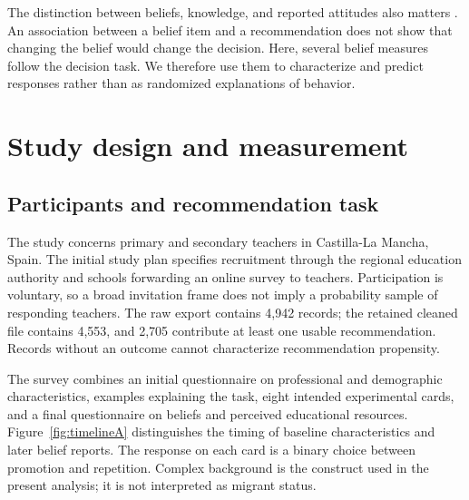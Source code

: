 The distinction between beliefs, knowledge, and reported attitudes also matters \cite{pajares}. An association between a belief item and a recommendation does not show that changing the belief would change the decision. Here, several belief measures follow the decision task. We therefore use them to characterize and predict responses rather than as randomized explanations of behavior.


\section{Study design and measurement}
\subsection{Participants and recommendation task}
The study concerns primary and secondary teachers in Castilla-La Mancha, Spain. The initial study plan specifies recruitment through the regional education authority and schools forwarding an online survey to teachers. Participation is voluntary, so a broad invitation frame does not imply a probability sample of responding teachers. The raw export contains 4,942 records; the retained cleaned file contains 4,553, and 2,705 contribute at least one usable recommendation. Records without an outcome cannot characterize recommendation propensity.

The survey combines an initial questionnaire on professional and demographic characteristics, examples explaining the task, eight intended experimental cards, and a final questionnaire on beliefs and perceived educational resources. Figure~\ref{fig:timelineA} distinguishes the timing of baseline characteristics and later belief reports. The response on each card is a binary choice between promotion and repetition. Complex background is the construct used in the present analysis; it is not interpreted as migrant status.

